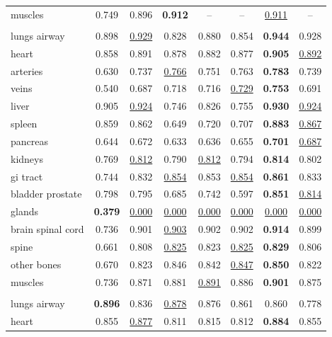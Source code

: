 \begin{minipage}{\textwidth}
{\begin{tabular}{@{}lccccccc@{}}
muscles & 0.749 & 0.896 & \textbf{0.912} & -- & -- & \underline{0.911} & -- \\
\addlinespace
\multicolumn{8}{@{}l}{\textit{joint}} \\
lungs airway & 0.898 & \underline{0.929} & 0.828 & 0.880 & 0.854 & \textbf{0.944} & 0.928 \\
heart & 0.858 & 0.891 & 0.878 & 0.882 & 0.877 & \textbf{0.905} & \underline{0.892} \\
arteries & 0.630 & 0.737 & \underline{0.766} & 0.751 & 0.763 & \textbf{0.783} & 0.739 \\
veins & 0.540 & 0.687 & 0.718 & 0.716 & \underline{0.729} & \textbf{0.753} & 0.691 \\
liver & 0.905 & \underline{0.924} & 0.746 & 0.826 & 0.755 & \textbf{0.930} & \underline{0.924} \\
spleen & 0.859 & 0.862 & 0.649 & 0.720 & 0.707 & \textbf{0.883} & \underline{0.867} \\
pancreas & 0.644 & 0.672 & 0.633 & 0.636 & 0.655 & \textbf{0.701} & \underline{0.687} \\
kidneys & 0.769 & \underline{0.812} & 0.790 & \underline{0.812} & 0.794 & \textbf{0.814} & 0.802 \\
gi tract & 0.744 & 0.832 & \underline{0.854} & 0.853 & \underline{0.854} & \textbf{0.861} & 0.833 \\
bladder prostate & 0.798 & 0.795 & 0.685 & 0.742 & 0.597 & \textbf{0.851} & \underline{0.814} \\
glands & \textbf{0.379} & \underline{0.000} & \underline{0.000} & \underline{0.000} & \underline{0.000} & \underline{0.000} & \underline{0.000} \\
brain spinal cord & 0.736 & 0.901 & \underline{0.903} & 0.902 & 0.902 & \textbf{0.914} & 0.899 \\
spine & 0.661 & 0.808 & \underline{0.825} & 0.823 & \underline{0.825} & \textbf{0.829} & 0.806 \\
other bones & 0.670 & 0.823 & 0.846 & 0.842 & \underline{0.847} & \textbf{0.850} & 0.822 \\
muscles & 0.736 & 0.871 & 0.881 & \underline{0.891} & 0.886 & \textbf{0.901} & 0.875 \\
\addlinespace
\multicolumn{8}{@{}l}{\textit{joint (8000 steps)}} \\
lungs airway & \textbf{0.896} & 0.836 & \underline{0.878} & 0.876 & 0.861 & 0.860 & 0.778 \\
heart & 0.855 & \underline{0.877} & 0.811 & 0.815 & 0.812 & \textbf{0.884} & 0.855 \\

\end{tabular}}
\end{minipage}
